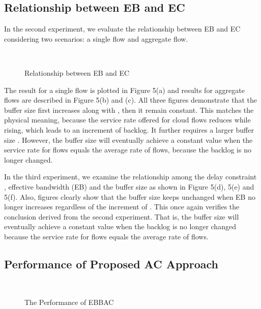 \documentclass[a4paper]{article}
\begin{document}
\subsection{Relationship between EB and EC}

In the second experiment, we evaluate the relationship between EB and EC considering two scenarios: a single flow and aggregate flow.

\begin{figure}[h]
  \centering
  \\
  \caption{Relationship between EB and EC}
  \label{fig4}
\end{figure}

The result for a single flow is plotted in Figure 5(a) and results for aggregate flows are described in Figure 5(b) and (c). All three figures demonstrate that the buffer size  first increases along with , then it remain constant. This matches the physical meaning, because the service rate offered for cloud flows reduces while  rising, which leads to an increment of backlog. It further requires a larger buffer size . However, the buffer size will eventually achieve a constant value when the service rate for flows equals the average rate of flows, because the backlog is no longer changed.

In the third experiment, we examine the relationship among the delay constraint , effective bandwidth (EB) and the buffer size  as shown in Figure 5(d), 5(e) and 5(f). Also, figures clearly show that the buffer size  keeps unchanged when EB no longer increases regardless of the increment of . This once again verifies the conclusion derived from the second experiment. That is, the buffer size will eventually achieve a constant value when the backlog is no longer changed because the service rate for flows equals the average rate of flows.

\subsection{Performance of Proposed AC Approach}

\begin{figure}[h]
  \centering
  \\
  \caption{The Performance of EBBAC}
  \label{fig5}
\end{figure}
\end{document}
